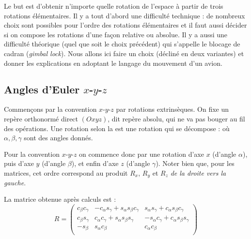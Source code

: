 \documentclass[11pt,class=report,crop=false]{standalone}
\begin{document}
Le but est d'obtenir n'importe quelle rotation de l'espace à partir de trois rotations élémentaires.
Il y a tout d'abord une difficulté technique : de nombreux choix sont possibles pour l'ordre des rotations élémentaires et il faut aussi décider si on compose les rotations d'une façon relative ou absolue. Il y a aussi une difficulté théorique (quel que soit le choix précédent) qui s'appelle le \og{}blocage de cadran\fg{} (\emph{gimbal lock}).   
Nous allons ici faire un choix (décliné en deux variantes) et donner les explications en adoptant le langage du mouvement d'un avion.

\subsection{Angles d'Euler $x$-$y$-$z$}
\label{ssec:eulerxyz}


Commençons par la convention $x$-$y$-$z$ par rotations extrinsèques.
On fixe un repère orthonormé direct $(Oxyz)$, dit repère absolu, qui ne va pas bouger au fil des opérations.
Une rotation selon la  est une rotation qui se décompose :
où $\alpha, \beta, \gamma$ sont des angles donnés.


Pour la convention  $x$-$y$-$z$ on commence donc par une rotation d'axe $x$ (d'angle $\alpha$), puis d'axe $y$ (d'angle $\beta$), et enfin d'axe $z$ (d'angle $\gamma$). Noter bien que, pour les matrices, cet ordre correspond au produit $R_x$, $R_y$ et  $R_z$ \emph{de la droite vers la gauche}.

La matrice obtenue après calculs est :
$$
R = \begin{pmatrix}
c_\beta c_\gamma & - c_\alpha s_\gamma + s_\alpha s_\beta c_\gamma &  s_\alpha s_\gamma + c_\alpha s_\beta c_\gamma \\
c_\beta s_\gamma & c_\alpha c_\gamma + s_\alpha s_\beta s_\gamma   &  - s_\alpha c_\gamma + c_\alpha s_\beta s_\gamma \\
- s_\beta        &  s_\alpha c_\beta                               &  c_\alpha c_\beta \\  
\end{pmatrix}
$$


\end{document}
